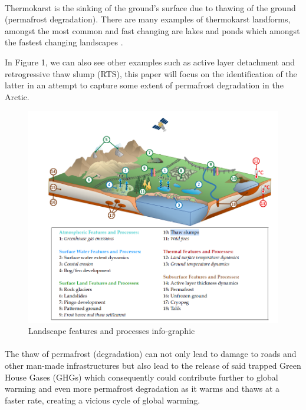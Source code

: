 \documentclass{article}
\begin{document}
\paragraph{}
Thermokarst is the  sinking of the ground's surface due to thawing of the ground (permafrost degradation). There are many examples of thermokarst landforms, amongst the most common and fast changing are lakes and ponds which amongst the fastest changing landscapes \cite{thawpic}.

In Figure 1, we can also see other examples such as active layer detachment and retrogressive thaw slump (RTS), this paper will focus on the identification of the latter in an attempt to capture some extent of permafrost degradation in the Arctic.

    \begin{figure}[hbt!]
        \centering
        \includegraphics[width=1 \textwidth]{fig 1 thermokrast landform.png}
        \caption{Landscape features and processes info-graphic \cite{rs13061217}}
    \end{figure}

\paragraph{}
The thaw of permafrost (degradation) can not only lead to damage to roads and other man-made infrastructures but also lead to the release of said trapped Green House Gases (GHGs) which consequently could contribute further to global warming and even more permafrost degradation \cite{MURTON2021857} as it warms and thaws at a faster rate, creating a vicious cycle of global warming.
\end{document}
